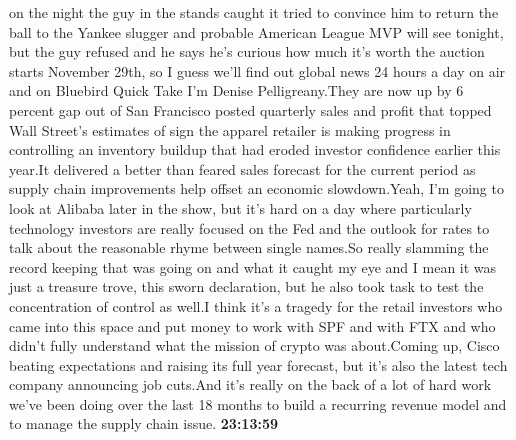 \documentclass{article}%
\begin{document}
on the night the guy in the stands caught it tried to convince him to return the ball to the Yankee slugger and probable American League MVP will see tonight, but the guy refused and he says he's curious how much it's worth the auction starts November 29th, so I guess we'll find out global news 24 hours a day on air and on Bluebird Quick Take I'm Denise Pelligreany.They are now up by 6 percent gap out of San Francisco posted quarterly sales and profit that topped Wall Street's estimates of sign the apparel retailer is making progress in controlling an inventory buildup that had eroded investor confidence earlier this year.It delivered a better than feared sales forecast for the current period as supply chain improvements help offset an economic slowdown.Yeah, I'm going to look at Alibaba later in the show, but it's hard on a day where particularly technology investors are really focused on the Fed and the outlook for rates to talk about the reasonable rhyme between single names.So really slamming the record keeping that was going on and what it caught my eye and I mean it was just a treasure trove, this sworn declaration, but he also took task to test the concentration of control as well.I think it's a tragedy for the retail investors who came into this space and put money to work with SPF and with FTX and who didn't fully understand what the mission of crypto was about.Coming up, Cisco beating expectations and raising its full year forecast, but it's also the latest tech company announcing job cuts.And it's really on the back of a lot of hard work we've been doing over the last 18 months to build a recurring revenue model and to manage the supply chain issue.%
\textbf{23:13:59}%
\newline%
\end{document}
